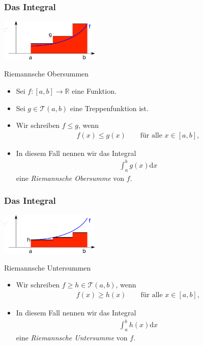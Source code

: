 \documentclass{beamer}
\renewcommand{\emph}[1]{{\textcolor{solarizedRed}{\itshape #1}}}
\newcommand\dd{\mathrm d}
\newcommand\cT{\mathcal T}
\newcommand\RR{\mathbb R}
\newcommand{\ue}{\"u}
\newcommand{\mytitle}{Das Integral}
\begin{document}
\begin{frame}\frametitle{\mytitle}
\hfill	\includegraphics[height=20mm]{pics/int3.pdf}
	\begin{block}{Riemannsche Obersummen}
		\begin{itemize}
			\item Sei $f:[a,b]\to\RR$ eine Funktion.
			\item Sei $g\in\cT(a,b)$ eine Treppenfunktion ist.
			\item Wir schreiben $f\leq g$, wenn
				\begin{align*}
					f(x)\leq g(x)\qquad\mbox{f\ue r alle }x\in[a,b],
				\end{align*}
			\item In diesem Fall nennen wir das Integral
				\begin{align*}
					\int_a^bg(x)\dd x
				\end{align*}
				eine \emph{Riemannsche Obersumme} von $f$.
		\end{itemize}
	\end{block}
\end{frame}

\begin{frame}\frametitle{\mytitle}
\hfill	\includegraphics[height=20mm]{pics/int4.pdf}
	\begin{block}{Riemannsche Untersummen}
		\begin{itemize}
			\item Wir schreiben $f\geq h\in\cT(a,b)$, wenn
				\begin{align*}
					f(x)\geq h(x)\qquad\mbox{f\ue r alle }x\in[a,b],
				\end{align*}
			\item In diesem Fall nennen wir das Integral
				\begin{align*}
					\int_a^bh(x)\dd x
				\end{align*}
				eine \emph{Riemannsche Untersumme} von $f$.
		\end{itemize}
	\end{block}
\end{frame}
\end{document}
